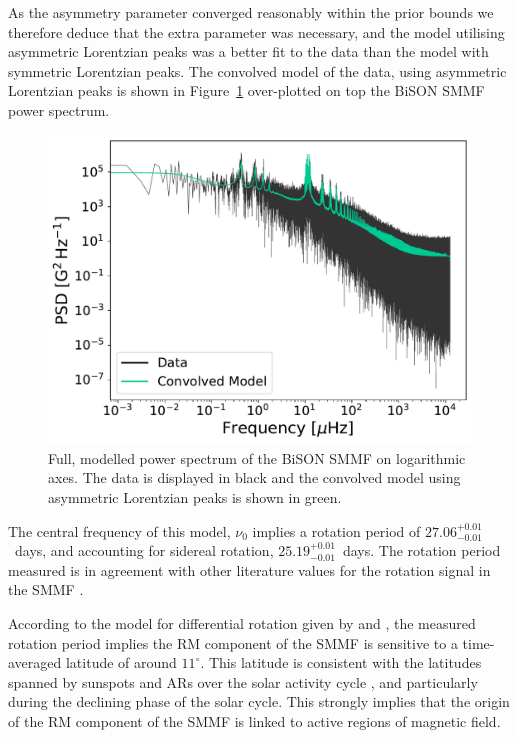 As the asymmetry parameter converged reasonably within the prior bounds we therefore deduce that the extra parameter was necessary, and the model utilising asymmetric Lorentzian peaks was a better fit to the data than the model with symmetric Lorentzian peaks. The convolved model of the data, using asymmetric Lorentzian peaks is shown in Figure~\ref{fig:BiSON_PSD_fit} over-plotted on top the BiSON SMMF power spectrum.


\begin{figure}[ht!]
	\centering
	\includegraphics[width=\columnwidth]{BiSON_PSD_model.pdf}
	\caption{Full, modelled power spectrum of the BiSON SMMF on logarithmic axes. The data is displayed in black and the convolved model using asymmetric Lorentzian peaks is shown in green.}
	\label{fig:BiSON_PSD_fit}
\end{figure}


The central frequency of this model, $\nu_0$ implies a rotation period of $27.06^{+0.01}_{-0.01}$~days, and accounting for sidereal rotation, $25.19^{+0.01}_{-0.01}$~days. The rotation period measured is in agreement with other literature values for the rotation signal in the SMMF \citep{chaplin_studies_2003, xie_temporal_2017}. 

According to the model for differential rotation given by \citet{snodgrass_magnetic_1983} and \citet{brown_inferring_1989}, the measured rotation period implies the RM component of the SMMF is sensitive to a time-averaged latitude of around $11^{\circ}$. This latitude is consistent with the latitudes spanned by sunspots and ARs over the solar activity cycle \citep{maunder_note_1904, mcintosh_deciphering_2014, thomas_asteroseismic_2019}, and particularly during the declining phase of the solar cycle. This strongly implies that the origin of the RM component of the SMMF is linked to active regions of magnetic field.

